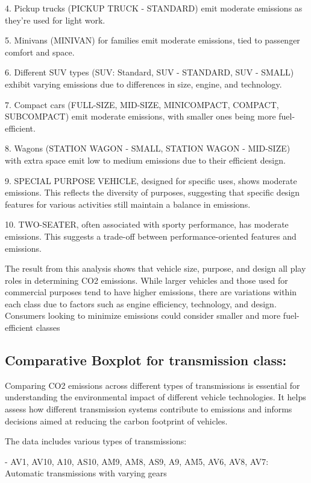 \documentclass[12pt, a4paper,oneside]{book}
\numberwithin{equation}{section}
\begin{document}
4.	Pickup trucks (PICKUP TRUCK - STANDARD) emit moderate emissions as they're used for light work.

5.	Minivans (MINIVAN) for families emit moderate emissions, tied to passenger comfort and space.

6.	Different SUV types (SUV: Standard, SUV - STANDARD, SUV - SMALL) exhibit varying emissions due to differences in size, engine, and technology.

7.	Compact cars (FULL-SIZE, MID-SIZE, MINICOMPACT, COMPACT, SUBCOMPACT) emit moderate emissions, with smaller ones being more fuel-efficient.

8.	Wagons (STATION WAGON - SMALL, STATION WAGON - MID-SIZE) with extra space emit low to medium emissions due to their efficient design.

9.	SPECIAL PURPOSE VEHICLE, designed for specific uses, shows moderate emissions. This reflects the diversity of purposes, suggesting that specific design features for various activities still maintain a balance in emissions.

10.	TWO-SEATER, often associated with sporty performance, has moderate emissions. This suggests a trade-off between performance-oriented features and emissions.


The result from this analysis shows that vehicle size, purpose, and design all play roles in determining CO2 emissions. While larger vehicles and those used for commercial purposes tend to have higher emissions, there are variations within each class due to factors such as engine efficiency, technology, and design. Consumers looking to minimize emissions could consider smaller and more fuel-efficient classes

\newpage

\subsection{Comparative Boxplot for transmission class:}

Comparing CO2 emissions across different types of transmissions is essential for understanding the environmental impact of different vehicle technologies. It helps assess how different transmission systems contribute to emissions and informs decisions aimed at reducing the carbon footprint of vehicles.
  
The data includes various types of transmissions:

-	AV1, AV10, A10, AS10, AM9, AM8, AS9, A9, AM5, AV6, AV8, AV7: Automatic transmissions with varying gears
\end{document}
